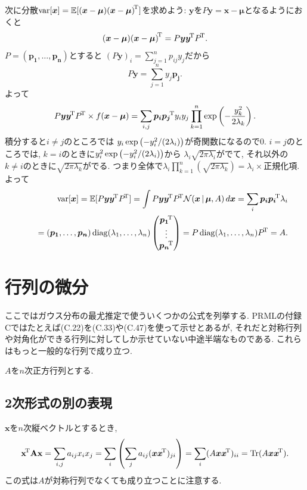 次に分散$\mathop{\mathrm{var}}\nolimits[\bm{x}]=\mathbb{E}[(\bm{x}-\bm{\mu}){(\bm{x}-\bm{\mu})}^{\!\mathrm{T}}]$を求めよう:
$\bm{y}$を$P\bm{y} = \bm{x}-\bm{\mu}$となるようにおくと
$$
(\bm{x}-\bm{\mu}){(\bm{x}-\bm{\mu})}^{\!\mathrm{T}}=P\bm{y}{\bm{y}}^{\!\mathrm{T}}{P}^{\!\mathrm{T}}.
$$
$P=(\bm{p_1}, \ldots, \bm{p_n})$とすると
$(P\bm{y})_i = \sum_{j=1}^n p_{ij} y_j$だから
$$P\bm{y} = \sum_{j=1}^n y_j \bm{p_j}.$$
よって
$$
P\bm{y}{\bm{y}}^{\!\mathrm{T}}{P}^{\!\mathrm{T}} \times f(\bm{x}-\bm{\mu})
=
\sum_{i,j}
  \bm{p_i}{\bm{p_j}}^{\!\mathrm{T}} y_i y_j
  \prod_{k=1}^n \exp\left(-\frac{y_k^2}{2\lambda_k}\right).
$$
積分すると$i\neq j$のところでは
$y_i \exp\left(-y_i^2/(2\lambda_i)\right)$が奇関数になるので$0$.
$i=j$のところでは,
$k=i$のときに$y_i^2 \exp\left(-y_i^2/(2\lambda_i)\right)$から
$\lambda_i\sqrt{2\pi\lambda_i}$がでて,
それ以外の$k\neq i$のときに$\sqrt{2\pi\lambda_k}$がでる.
つまり全体で$\lambda_i \prod_{k=1}^n(\sqrt{2\pi\lambda_k})=\lambda_i \times \text{正規化項}$.
よって
\begin{eqnarray*}
&&
\var[\bm{x}] =
\EE[P\bm{y}\trans{\bm{y}}\trans{P}]
 = \int P\bm{y}\trans{\bm{y}}\trans{P}
   \fnvPair\calN(\bm{x}|\bm{\mu}, A) d\bm{x}
 = \sum_i \bm{p_i}\trans{\bm{p_i}} \lambda_i
\\
&& \hseq
 = (\bm{p_1}, \ldots, \bm{p_n}) \diag(\lambda_1, \ldots, \lambda_n)
\begin{pmatrix}
\trans{\bm{p_1}} \\
\vdots \\
\trans{\bm{p_n}}
\end{pmatrix}
= P \diag(\lambda_1, \ldots, \lambda_n) \trans{P}
= A.
\end{eqnarray*}
\vspace{0pt}

\section{行列の微分}
ここではガウス分布の最尤推定で使ういくつかの公式を列挙する.
PRMLの付録Cではたとえば(C.22)を(C.33)や(C.47)を使って示せとあるが,
それだと対称行列や対角化ができる行列に対してしか示せていない中途半端なものである.
これらはもっと一般的な行列で成り立つ.

$A$を$n$次正方行列とする.

\subsection{2次形式の別の表現}
$\bm{x}$を$n$次縦ベクトルとするとき,
\begin{equation}\label{quad}
{\mathbf{\boldsymbol{x}}}^{\!\mathrm{T}} \mathbf{\boldsymbol{A}} \mathbf{\boldsymbol{x}}=\sum_{i,j} a_{ij} x_i x_j=\sum_i \left(\sum_j a_{ij} (\bm{x}{\bm{x}}^{\!\mathrm{T}})_{ji}\right)=\sum_i (A \bm{x}{\bm{x}}^{\!\mathrm{T}})_{ii}=\mathop{\mathrm{Tr}}\nolimits(A \bm{x}{\bm{x}}^{\!\mathrm{T}}).
\end{equation}
この式は$A$が対称行列でなくても成り立つことに注意する.

